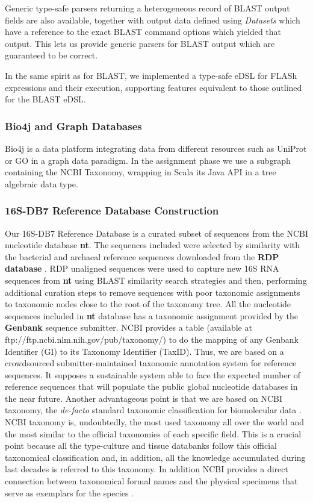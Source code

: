 \documentclass[fleqn,10pt,lineno]{wlpeerj}
\begin{document}
Generic type-safe parsers returning a heterogeneous record of BLAST
output fields are also available, together with output data defined
using \emph{Datasets} which have a reference to the exact BLAST command
options which yielded that output. This lets us provide generic parsers
for BLAST output which are guaranteed to be correct.

In the same spirit as for BLAST, we implemented a type-safe eDSL for
FLASh expressions and their execution, supporting features equivalent to
those outlined for the BLAST eDSL.

\subsubsection{Bio4j and Graph
Databases}\label{bio4j-and-graph-databases}

Bio4j \citep{pareja2015bio4j} is a data platform integrating data from
different resources such as UniProt or GO in a graph data paradigm. In
the assignment phase we use a subgraph containing the NCBI Taxonomy,
wrapping in Scala its Java API in a tree algebraic data type.

\subsubsection{16S-DB7 Reference Database
Construction}\label{s-db7-reference-database-construction}

Our 16S-DB7 Reference Database is a curated subset of sequences from the
NCBI nucleotide database \textbf{nt}. The sequences included were
selected by similarity with the bacterial and archaeal reference
sequences downloaded from the \textbf{RDP database}
\citep{cole2013ribosomal}. RDP unaligned sequences were used to capture
new 16S RNA sequences from \textbf{nt} using BLAST similarity search
strategies and then, performing additional curation steps to remove
sequences with poor taxonomic assignments to taxonomic nodes close to
the root of the taxonomy tree. All the nucleotide sequences included in
\textbf{nt} database has a taxonomic assignment provided by the
\textbf{Genbank} sequence submitter. NCBI provides a table (available at
ftp://ftp.ncbi.nlm.nih.gov/pub/taxonomy/) to do the mapping of any
Genbank Identifier (GI) to its Taxonomy Identifier (TaxID). Thus, we are
based on a crowdsourced submitter-maintained taxonomic annotation system
for reference sequences. It supposes a sustainable system able to face
the expected number of reference sequences that will populate the public
global nucleotide databases in the near future. Another advantageous
point is that we are based on NCBI taxonomy, the \emph{de-facto}
standard taxonomic classification for biomolecular data
\citep{cochrane20102010}. NCBI taxonomy is, undoubtedly, the most used
taxonomy all over the world and the most similar to the official
taxonomies of each specific field. This is a crucial point because all
the type-culture and tissue databanks follow this official taxonomical
classification and, in addition, all the knowledge accumulated during
last decades is referred to this taxonomy. In addition NCBI provides a
direct connection between taxonomical formal names and the physical
specimens that serve as exemplars for the species
\citep{federhen2014type}.
\end{document}
